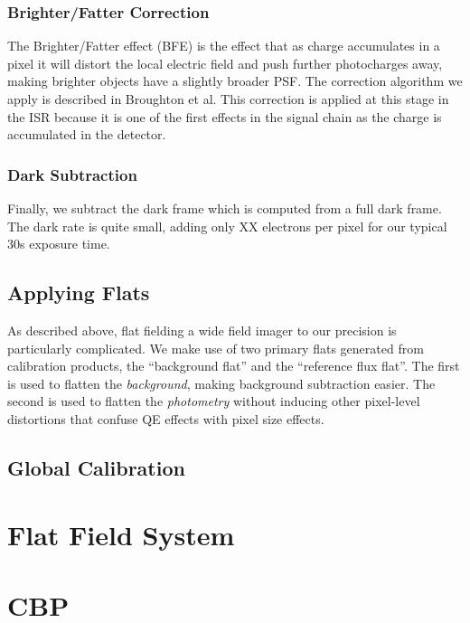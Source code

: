 \documentclass[SE,authoryear,lsstdraft,toc]{lsstdoc}
\begin{document}
\subsubsection{Brighter/Fatter Correction}

The Brighter/Fatter effect (BFE) is the effect that as charge accumulates in a
pixel it will distort the local electric field and push further photocharges
away, making brighter objects have a slightly broader PSF.  The correction
algorithm we apply is described in Broughton et al.  This correction is applied
at this stage in the ISR because it is one of the first effects in the signal
chain as the charge is accumulated in the detector.

\subsubsection{Dark Subtraction}

Finally, we subtract the dark frame which is computed from a full dark frame.
The dark rate is quite small, adding only XX electrons per pixel for our
typical 30s exposure time.

\subsection{Applying Flats}

As described above, flat fielding a wide field imager to our precision is
particularly complicated.  We make use of two primary flats generated from
calibration products, the ``background flat'' and the ``reference flux flat''.
The first is used to flatten the \emph{background}, making background
subtraction easier.  The second is used to flatten the \emph{photometry}
without inducing other pixel-level distortions that confuse QE effects with
pixel size effects.



\subsection{Global Calibration}

\section{Flat Field System}


\section{CBP}
\end{document}
